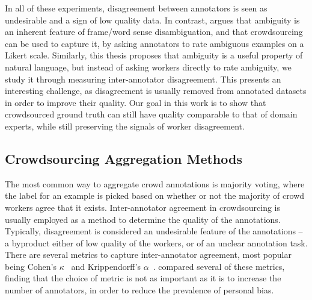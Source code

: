 In all of these experiments, disagreement between annotators is seen as undesirable and a sign of low quality data. In contrast, \citet{jurgens2013embracing} argues that ambiguity is an inherent feature of frame/word sense disambiguation, and that crowdsourcing can be used to capture it, by asking annotators to rate ambiguous examples on a Likert scale. Similarly, this thesis proposes that ambiguity is a useful property of natural language, but instead of asking workers directly to rate ambiguity, we study it through measuring inter-annotator disagreement. This presents an interesting challenge, as disagreement is usually removed from annotated datasets in order to improve their quality. Our goal in this work is to show that crowdsourced ground truth can still have quality comparable to that of domain experts, while still preserving the signals of worker disagreement.


\subsection{Crowdsourcing Aggregation Methods}

The most common way to aggregate crowd annotations is majority voting, where the label for an example is picked based on whether or not the majority of crowd workers agree that it exists. Inter-annotator agreement in crowdsourcing is usually employed as a method to determine the quality of the annotations. Typically, disagreement is considered an undesirable feature of the annotations -- a byproduct either of low quality of the workers, or of an unclear annotation task. There are several metrics to capture inter-annotator agreement, most popular being Cohen's $\kappa$~\cite{cohen1960kappa} and Krippendorff's $\alpha$~\cite{klaus2013content}. \citet{artstein2008inter} compared several of these metrics, finding that the choice of metric is not as important as it is to increase the number of annotators, in order to reduce the prevalence of personal bias.

